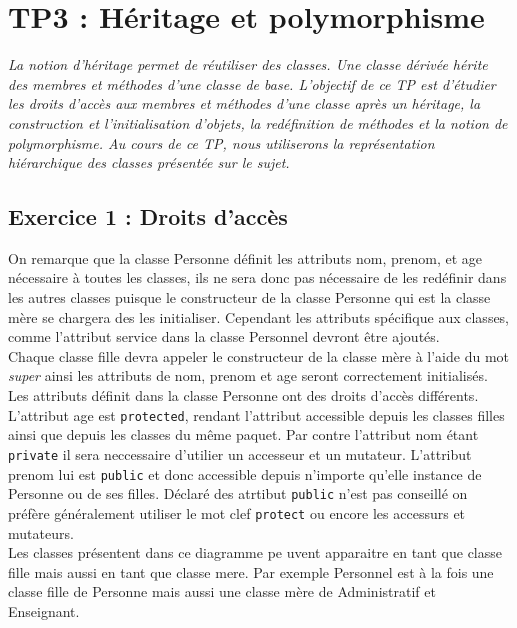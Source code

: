 \chapter{TP3 : Héritage et polymorphisme}
\textit{La notion d'héritage permet de réutiliser des classes. Une classe dérivée hérite des membres et méthodes d'une classe de base. L'objectif de ce TP est d'étudier les droits d'accès aux membres et méthodes d'une classe après un héritage, la construction et l'initialisation d'objets, la redéfinition de méthodes et la notion de polymorphisme. Au cours de ce TP, nous utiliserons la représentation hiérarchique des classes présentée sur le sujet.}

\section{Exercice 1 : Droits d'accès}
On remarque que la classe Personne définit les attributs nom, prenom, et age nécessaire à toutes les classes, ils ne sera donc pas nécessaire de les redéfinir dans les autres classes puisque le constructeur de la classe Personne qui est la classe mère se chargera des les initialiser. Cependant les attributs spécifique aux classes, comme l'attribut service dans la classe Personnel devront être ajoutés.\\
Chaque classe fille devra appeler le constructeur de la classe mère à l'aide du mot \textit{super} ainsi les attributs de nom, prenom et age seront correctement initialisés.\\
Les attributs définit dans la classe Personne ont des droits d'accès différents. L'attribut age est \texttt{protected}, rendant l'attribut accessible depuis les classes filles ainsi que depuis les classes du même paquet. Par contre l'attribut nom étant \texttt{private} il sera neccessaire d'utilier un accesseur et un mutateur. L'attribut prenom lui est \texttt{public} et donc accessible depuis n'importe qu'elle instance de Personne ou de ses filles. Déclaré des atrtibut \texttt{public} n'est pas conseillé on préfère généralement utiliser le mot clef \texttt{protect} ou encore les accessurs et mutateurs.\\
Les classes présentent dans ce diagramme pe uvent apparaitre en tant que classe fille mais aussi en tant que classe mere. Par exemple Personnel est à la fois une classe fille de Personne mais aussi une classe mère de Administratif et Enseignant.

